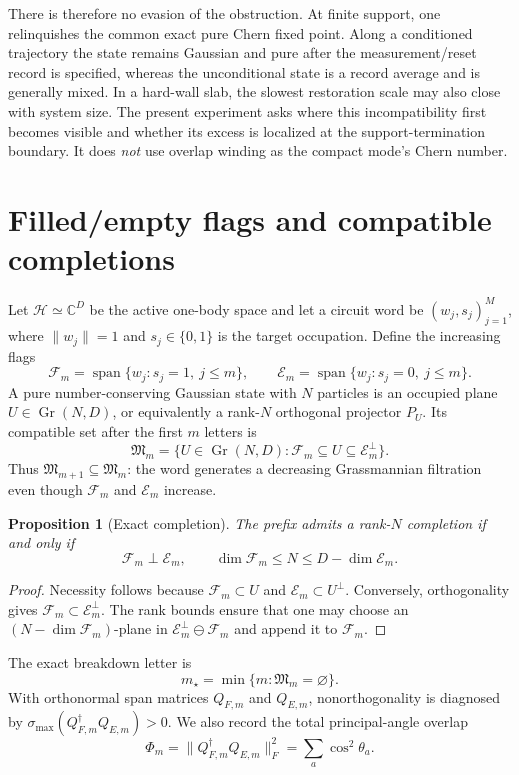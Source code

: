 \documentclass[aps,prb,onecolumn,nofootinbib,superscriptaddress]{revtex4-2}
\newtheorem{proposition}{Proposition}
\newcommand{\Gr}{\operatorname{Gr}}
\newcommand{\Span}{\operatorname{span}}
\newcommand{\cH}{\mathcal H}
\newcommand{\cF}{\mathcal F}
\newcommand{\cE}{\mathcal E}
\newcommand{\cM}{\mathfrak M}
\begin{document}
There is therefore no evasion of the obstruction.  At finite support, one relinquishes
the common exact pure Chern fixed point.  Along a conditioned trajectory the state
remains Gaussian and pure after the measurement/reset record is specified, whereas the
unconditional state is a record average and is generally mixed.  In a hard-wall slab,
the slowest restoration scale may also close with system size.  The present experiment
asks where this incompatibility first becomes visible and whether its excess is
localized at the support-termination boundary.  It does \emph{not} use overlap winding
as the compact mode's Chern number.

\section{Filled/empty flags and compatible completions}

Let $\cH\simeq\mathbb C^D$ be the active one-body space and let a circuit word be
$(w_j,s_j)_{j=1}^M$, where $\lVert w_j\rVert=1$ and $s_j\in\{0,1\}$ is the target
occupation.  Define the increasing flags
\begin{equation}
 \cF_m=\Span\{w_j:s_j=1,\ j\le m\},\qquad
 \cE_m=\Span\{w_j:s_j=0,\ j\le m\}.
\end{equation}
A pure number-conserving Gaussian state with $N$ particles is an occupied plane
$U\in\Gr(N,D)$, or equivalently a rank-$N$ orthogonal projector $P_U$.  Its compatible
set after the first $m$ letters is
\begin{equation}
 \cM_m=\{U\in\Gr(N,D):\cF_m\subseteq U\subseteq\cE_m^\perp\}.
\end{equation}
Thus $\cM_{m+1}\subseteq\cM_m$: the word generates a decreasing Grassmannian
filtration even though $\cF_m$ and $\cE_m$ increase.

\begin{proposition}[Exact completion]
The prefix admits a rank-$N$ completion if and only if
\begin{equation}
 \cF_m\perp\cE_m,
 \qquad \dim\cF_m\le N\le D-\dim\cE_m.
 \label{eq:completion}
\end{equation}
\end{proposition}
\begin{proof}
Necessity follows because $\cF_m\subset U$ and $\cE_m\subset U^\perp$.  Conversely,
orthogonality gives $\cF_m\subset\cE_m^\perp$.  The rank bounds ensure that one may
choose an $(N-\dim\cF_m)$-plane in
$\cE_m^\perp\ominus\cF_m$ and append it to $\cF_m$.
\end{proof}
The exact breakdown letter is
\begin{equation}
 m_\star=\min\{m:\cM_m=\varnothing\}.
\end{equation}
With orthonormal span matrices $Q_{F,m}$ and $Q_{E,m}$, nonorthogonality is diagnosed by
$\sigma_{\max}(Q_{F,m}^\dagger Q_{E,m})>0$.  We also record the total principal-angle
overlap
\begin{equation}
 \Phi_m=\lVert Q_{F,m}^\dagger Q_{E,m}\rVert_F^2=\sum_a\cos^2\theta_a.
\end{equation}
\end{document}
